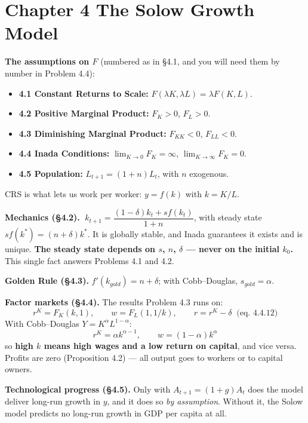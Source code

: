 \documentclass[12pt, letterpaper]{article}
\newcommand{\stst}{^{\ast}}
\begin{document}
\section{Chapter 4 \quad The Solow Growth Model}

\begin{tcolorbox}[theorybox,title={Chapter 4 Overview}]
\textbf{The assumptions on $F$} (numbered as in \S4.1, and you will need them by number in
Problem 4.4):
\begin{itemize}[leftmargin=1.3em,itemsep=2pt,topsep=2pt]
\item \textbf{4.1 Constant Returns to Scale:} $F(\lambda K, \lambda L) = \lambda F(K,L)$.
\item \textbf{4.2 Positive Marginal Product:} $F_K > 0$, $F_L > 0$.
\item \textbf{4.3 Diminishing Marginal Product:} $F_{KK} < 0$, $F_{LL} < 0$.
\item \textbf{4.4 Inada Conditions:} $\lim_{K\to 0}F_K = \infty$, $\lim_{K\to\infty}F_K = 0$.
\item \textbf{4.5 Population:} $L_{t+1} = (1+n)L_t$, with $n$ exogenous.
\end{itemize}
CRS is what lets us work per worker: $y = f(k)$ with $k = K/L$.

\medskip
\textbf{Mechanics (\S4.2).} $\;k_{t+1} = \dfrac{(1-\delta)k_t + s f(k_t)}{1+n}$, with steady
state $s f(k\stst) = (n+\delta)k\stst$. It is globally stable, and Inada guarantees it exists
and is unique. \textbf{The steady state depends on $s$, $n$, $\delta$ --- never on the initial
$k_0$.} This single fact answers Problems 4.1 and 4.2.

\medskip
\textbf{Golden Rule (\S4.3).} $f'(k_{gold}) = n+\delta$; with Cobb--Douglas, $s_{gold} = \alpha$.

\medskip
\textbf{Factor markets (\S4.4).} The results Problem 4.3 runs on:
$$r^K = F_K(k,1), \qquad w = F_L(1, 1/k), \qquad \boxed{r = r^K - \delta} \;\;\text{(eq.\ 4.4.12)}$$
With Cobb--Douglas $Y = K^\alpha L^{1-\alpha}$:
$$r^K = \alpha k^{\alpha-1}, \qquad w = (1-\alpha)k^{\alpha}$$
so \textbf{high $k$ means high wages and a low return on capital}, and vice versa. Profits are
zero (Proposition 4.2) --- all output goes to workers or to capital owners.

\medskip
\textbf{Technological progress (\S4.5).} Only with $A_{t+1}=(1+g)A_t$ does the model deliver
long-run growth in $y$, and it does so \emph{by assumption}. Without it, the Solow model
predicts no long-run growth in GDP per capita at all.
\end{tcolorbox}
\end{document}

